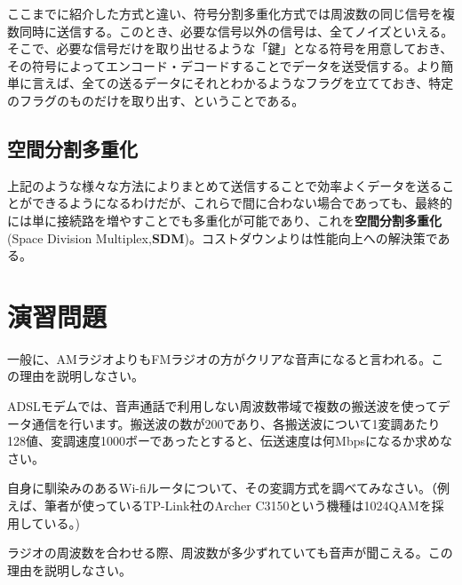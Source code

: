 ここまでに紹介した方式と違い、符号分割多重化方式では周波数の同じ信号を複数同時に送信する。このとき、必要な信号以外の信号は、全てノイズといえる。そこで、必要な信号だけを取り出せるような「鍵」となる符号を用意しておき、その符号によってエンコード・デコードすることでデータを送受信する。より簡単に言えば、全ての送るデータにそれとわかるようなフラグを立てておき、特定のフラグのものだけを取り出す、ということである。
\subsection{空間分割多重化}
上記のような様々な方法によりまとめて送信することで効率よくデータを送ることができるようになるわけだが、これらで間に合わない場合であっても、最終的には単に接続路を増やすことでも多重化が可能であり、これを\textbf{空間分割多重化}(Space Division Multiplex,\textbf{SDM})。コストダウンよりは性能向上への解決策である。


\section*{演習問題}
\begin{problems}
\item 一般に、AMラジオよりもFMラジオの方がクリアな音声になると言われる。この理由を説明しなさい。

\item ADSLモデムでは、音声通話で利用しない周波数帯域で複数の搬送波を使ってデータ通信を行います。搬送波の数が200であり、各搬送波について1変調あたり128値、変調速度1000ボーであったとすると、伝送速度は何Mbpsになるか求めなさい。

\item 自身に馴染みのあるWi-fiルータについて、その変調方式を調べてみなさい。（例えば、筆者が使っているTP-Link社のArcher C3150という機種は1024QAMを採用している。)

\item ラジオの周波数を合わせる際、周波数が多少ずれていても音声が聞こえる。この理由を説明しなさい。
\end{problems}

